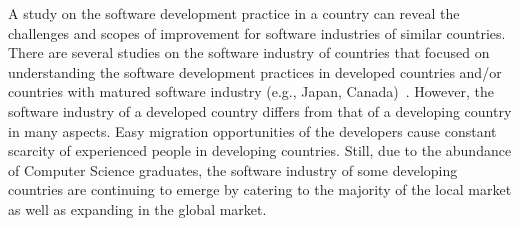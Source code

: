  A study on the software development practice in a country
can reveal the challenges and scopes of improvement for software industries of similar countries. There are several studies on the software
industry of countries that focused on understanding the software development practices 
in developed countries and/or countries with matured software industry (e.g., Japan, Canada)~\cite{Garousi2013, Garousi2015, Vonken2012, Wang2018}. However, 
the software industry of a developed country differs from that of a developing
country in many aspects. Easy migration opportunities of the developers cause
constant scarcity of experienced people in developing countries. Still, due to
the abundance of Computer Science graduates, the software industry of some
developing countries are continuing to emerge by catering to the majority of the
local market as well as expanding in the global market.



